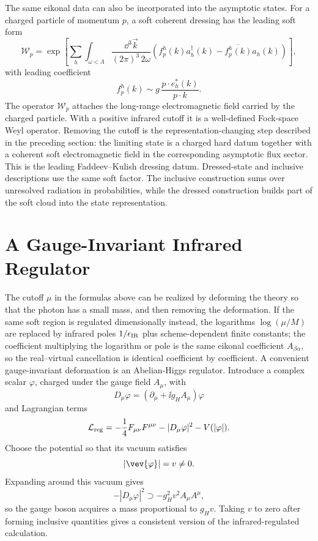 The same eikonal data can also be incorporated into the asymptotic states.
For a charged particle of momentum \(p\), a soft coherent dressing has the
leading soft form
\[
  \mathcal W_p
  =
  \exp\!\left[
    \sum_h
    \int_{\omega<\Lambda}
    \frac{\dd^3\vec k}{(2\pi)^3\,2\omega}
    \left(
      f_p^h(k)a_h^\dagger(k)
      -
      \overline{f_p^h(k)}a_h(k)
    \right)
  \right],
\]
with leading coefficient
\[
  f_p^h(k)\sim g\,\frac{p\cdot e_h^*(k)}{p\cdot k}.
\]
The operator \(\mathcal W_p\) attaches the long-range electromagnetic field
carried by the charged particle.  With a positive infrared cutoff it is a
well-defined Fock-space Weyl operator.  Removing the cutoff is the
representation-changing step described in the preceding section: the limiting
state is a charged hard datum together with a coherent soft electromagnetic
field in the corresponding asymptotic flux sector.  This is the leading
Faddeev--Kulish dressing datum.  Dressed-state and inclusive descriptions use
the same soft factor.  The inclusive construction sums over unresolved
radiation in probabilities, while the dressed construction builds part of the
soft cloud into the state representation.

\section{A Gauge-Invariant Infrared Regulator}

The cutoff \(\mu\) in the formulas above can be realized by deforming the
theory so that the photon has a small mass, and then removing the deformation.
If the same soft region is regulated dimensionally instead, the logarithms
\(\log(\mu/M)\) are replaced by infrared poles \(1/\epsilon_{\rm IR}\) plus
scheme-dependent finite constants; the coefficient multiplying the logarithm
or pole is the same eikonal coefficient \(A_{\beta\alpha}\), so the
real--virtual cancellation is identical coefficient by coefficient.
A convenient gauge-invariant deformation is an Abelian-Higgs regulator.
Introduce a complex scalar \(\varphi\), charged under the gauge field
\(A_\mu\), with
\[
  D_\mu\varphi=(\partial_\mu+\ii g_H A_\mu)\varphi
\]
and Lagrangian terms
\[
  \mathcal L_{\rm reg}
  =
  -\frac14F_{\mu\nu}F^{\mu\nu}
  -|D_\mu\varphi|^2
  -V(|\varphi|).
\]
Choose the potential so that its vacuum satisfies
\[
  |\vev{\varphi}|=v\ne0 .
\]
Expanding around this vacuum gives
\[
  -|D_\mu\varphi|^2
  \supset
  -g_H^2v^2 A_\mu A^\mu ,
\]
so the gauge boson acquires a mass proportional to \(g_Hv\).  Taking \(v\) to
zero after forming inclusive quantities gives a consistent version of the
infrared-regulated calculation.


